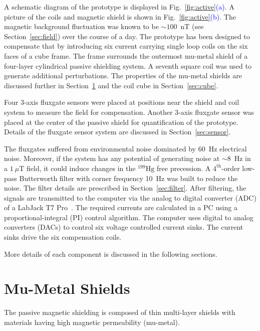 A schematic diagram of the prototype is displayed in Fig.~\ref{fig:active}\textcolor{blue}{(a)}. A picture of the coils and magnetic shield is shown in Fig.~\ref{fig:active}\textcolor{blue}{(b)}. The magnetic background fluctuation was known to be $\sim100$~nT (see Section~\ref{sec:field}) over the course of a day. The prototype has been designed to compensate that by introducing six current carrying single loop coils on the six faces of a cube frame. The frame surrounds the outermost mu-metal shield of a four-layer cylindrical passive shielding system. A seventh square coil was used to generate additional perturbations. The properties of the mu-metal shields are discussed further in Section~\ref{sec:shield} and the coil cube in Section~\ref{sec:cube}. 

Four 3-axis fluxgate sensors were placed at positions near the shield and coil system to measure the field for compensation. Another 3-axis fluxgate sensor was placed at the center of the passive shield for quantification of the prototype. Details of the fluxgate sensor system are discussed in Section~\ref{sec:sensor}.


The fluxgates suffered from environmental noise dominated by 60~Hz electrical noise. Moreover, if the system has any potential of generating noise at $\sim8$~Hz in a $1~\mu$T field, it could induce changes in the $\mathrm{^{199}Hg}$ free precession. A $\mathrm{4^{th}}$-order low-pass Butterworth filter with corner frequency 10~Hz was built to reduce the noise. The filter details are prescribed in Section~\ref{sec:filter}. After filtering, the signals are transmitted to the computer via the analog to digital converter (ADC) of a LabJack T7 Pro~\cite{T7}. The required currents are calculated in a PC using a proportional-integral (PI) control algorithm. The computer uses digital to analog converters (DACs) to control six voltage controlled current sinks. The current sinks drive the six compensation coils.

More details of each component is discussed in the following sections.

\section{Mu-Metal Shields}\label{sec:shield}
The passive magnetic shielding is composed of thin multi-layer shields with materials having high magnetic permeability (mu-metal). 

